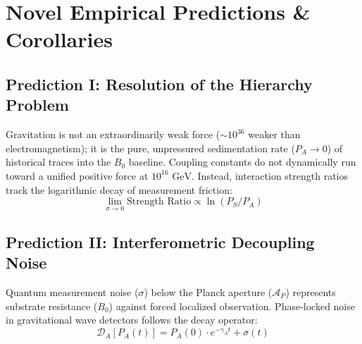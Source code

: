 \documentclass[11pt,a4paper]{article}
\begin{document}
\begin{table}[h!]
\centering
\small
{}
\caption{Aperture cascade mapping the fundamental interactions to assertion decay stages.}
\end{table}

\section{Novel Empirical Predictions \& Corollaries}

\subsection{Prediction I: Resolution of the Hierarchy Problem}
Gravitation is not an extraordinarily weak force ($\sim 10^{36}$ weaker than electromagnetism); it is the pure, unpressured sedimentation rate ($P_A \to 0$) of historical traces into the $B_0$ baseline. Coupling constants do not dynamically run toward a unified positive force at $10^{16} \text{ GeV}$. Instead, interaction strength ratios track the logarithmic decay of measurement friction:
\begin{equation}
\lim_{\sigma \to 0} \text{Strength Ratio} \propto \ln(P_S / P_A)
\end{equation}

\subsection{Prediction II: Interferometric Decoupling Noise}
Quantum measurement noise ($\sigma$) below the Planck aperture ($\mathcal{A}_P$) represents substrate resistance ($B_0$) against forced localized observation. Phase-locked noise in gravitational wave detectors follows the decay operator:
\begin{equation}
\mathcal{D}_A\left[ P_A(t) \right] = P_A(0) \cdot e^{-\gamma_A t} + \sigma(t)
\end{equation}
\end{document}
